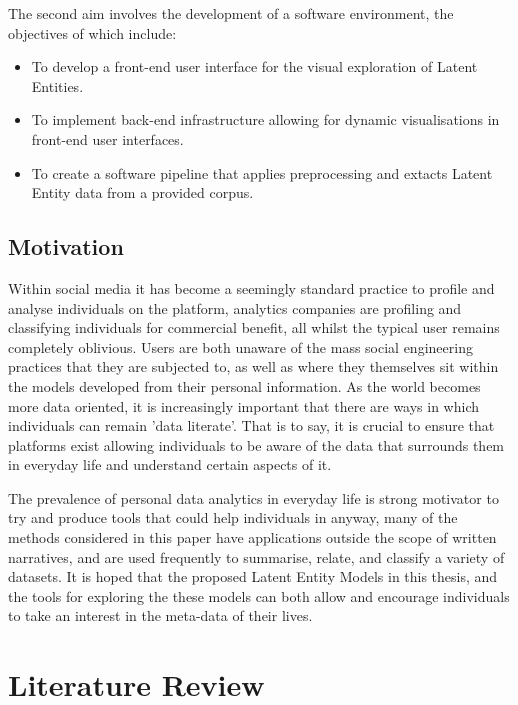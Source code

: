 \documentclass[10pt]{report}
\begin{document}
The second aim involves the development of a software environment, the objectives of which include:
\begin{itemize}
\item To develop a front-end user interface for the visual exploration of Latent Entities.  
\item To implement back-end infrastructure allowing for dynamic visualisations in front-end user interfaces.
  \item To create a software pipeline that applies preprocessing and extacts Latent Entity data from a provided corpus.
\end{itemize}
\renewcommand{\baselinestretch}{2.0}\normalsize

\section{Motivation}
Within social media it has become a seemingly standard practice to profile and analyse individuals on the platform, analytics companies are profiling and classifying individuals for commercial benefit, all whilst the typical user remains completely oblivious. Users are both unaware of the mass social engineering practices that they are subjected to, as well as where they themselves sit within the models developed from their personal information. As the world becomes more data oriented, it is increasingly important that there are ways in which individuals can remain 'data literate'. That is to say, it is crucial to ensure that platforms exist allowing individuals to be aware of the data that surrounds them in everyday life and understand certain aspects of it.

The prevalence of personal data analytics in everyday life is strong motivator to try and produce tools that could help individuals in anyway, many of the methods considered in this paper have applications outside the scope of written narratives, and are used frequently to summarise, relate, and classify a variety of datasets. It is hoped that the proposed Latent Entity Models in this thesis, and the tools for exploring the these models can both allow and encourage individuals to take an interest in the meta-data of their lives.

%
%
%
%
\chapter{Literature Review}
\end{document}
